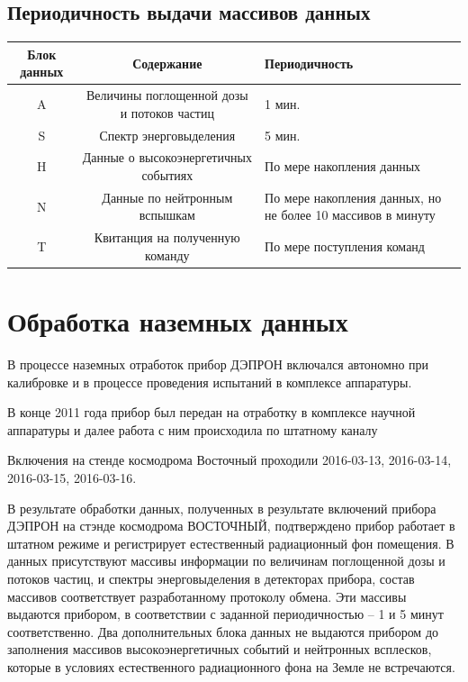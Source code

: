 \subsection{Периодичность выдачи массивов данных}
\begin{center}
	{\small 
		\begin{tabularx}{\textwidth}{|c|c|X|}
			\hline
			Блок данных & Содержание                                 & Периодичность \\ \hline
			     A      & Величины поглощенной дозы и потоков частиц & 1 мин. \\ \hline
			     S      & Спектр энерговыделения                     & 5 мин. \\ \hline
			     H      & Данные о высокоэнергетичных событиях       & По мере накопления данных \\ \hline
			     N      & Данные по нейтронным вспышкам              &  По мере накопления данных, но не более 10 массивов в минуту\\ \hline
			     T      & Квитанция на полученную команду            &  По мере поступления команд\\ \hline
		\end{tabularx}
}
\end{center}



\section{Обработка наземных данных}\label{sec3.2.1}
В процессе наземных отработок прибор ДЭПРОН включался автономно при калибровке и в процессе проведения испытаний в комплексе аппаратуры.


В конце 2011 года прибор был передан на отработку в комплексе научной аппаратуры и далее работа с ним происходила по штатному каналу

Включения на стенде космодрома Восточный проходили  
2016-03-13,
2016-03-14,
2016-03-15,
2016-03-16.


В результате обработки данных, полученных в результате включений прибора ДЭПРОН на стэнде космодрома ВОСТОЧНЫЙ, подтверждено прибор работает в штатном режиме и регистрирует естественный радиационный фон помещения.
В данных присутствуют массивы информации по величинам поглощенной дозы и потоков частиц, и спектры энерговыделения в детекторах прибора, состав массивов соответствует разработанному протоколу обмена. Эти массивы выдаются прибором, в соответствии с заданной периодичностью – 1 и 5 минут соответственно. Два дополнительных блока данных не выдаются прибором до заполнения массивов высокоэнергетичных событий и нейтронных всплесков, которые в условиях естественного радиационного фона на Земле не встречаются.

